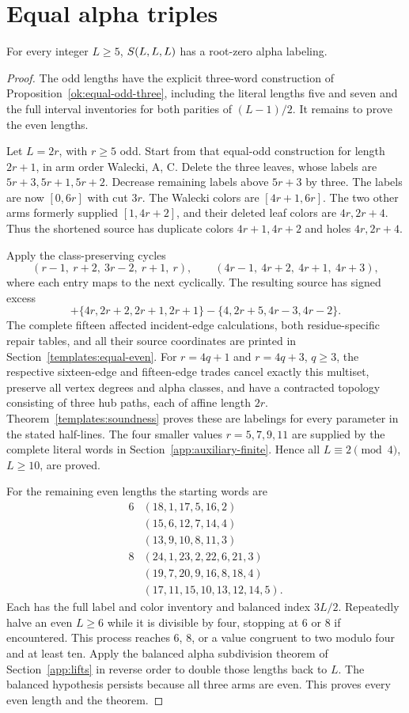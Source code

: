 \section{Equal alpha triples}\label{app:equal-alpha}
\begin{theorem}\label{ea:all}
For every integer $L\ge5$, $S\!\left(L,L,L\right)$ has a root-zero alpha labeling.
\end{theorem}
\begin{proof}
The odd lengths have the explicit three-word construction of Proposition~\ref{ok:equal-odd-three}, including the literal lengths five and seven and the full interval inventories for both parities of $(L-1)/2$. It remains to prove the even lengths.

Let $L=2r$, with $r\ge5$ odd. Start from that equal-odd construction for length $2r+1$, in arm order Walecki, A, C. Delete the three leaves, whose labels are $5r+3,5r+1,5r+2$. Decrease remaining labels above $5r+3$ by three. The labels are now $[0,6r]$ with cut $3r$. The Walecki colors are $[4r+1,6r]$. The two other arms formerly supplied $[1,4r+2]$, and their deleted leaf colors are $4r,2r+4$. Thus the shortened source has duplicate colors $4r+1,4r+2$ and holes $4r,2r+4$.

Apply the class-preserving cycles
\[
(r-1,\ r+2,\ 3r-2,\ r+1,\ r),\qquad
(4r-1,\ 4r+2,\ 4r+1,\ 4r+3),
\]
where each entry maps to the next cyclically. The resulting source has signed excess
\[
+\{4r,2r+2,2r+1,2r+1\}
-\{4,2r+5,4r-3,4r-2\}.
\]
The complete fifteen affected incident-edge calculations, both residue-specific repair tables, and all their source coordinates are printed in Section~\ref{templates:equal-even}. For $r=4q+1$ and $r=4q+3$, $q\ge3$, the respective sixteen-edge and fifteen-edge trades cancel exactly this multiset, preserve all vertex degrees and alpha classes, and have a contracted topology consisting of three hub paths, each of affine length $2r$. Theorem~\ref{templates:soundness} proves these are labelings for every parameter in the stated half-lines. The four smaller values $r=5,7,9,11$ are supplied by the complete literal words in Section~\ref{app:auxiliary-finite}. Hence all $L\equiv2\pmod4$, $L\ge10$, are proved.

For the remaining even lengths the starting words are
\[
\begin{array}{c|l}
6&(18,1,17,5,16,2)\\
 &(15,6,12,7,14,4)\\
 &(13,9,10,8,11,3)\\[2pt]
8&(24,1,23,2,22,6,21,3)\\
 &(19,7,20,9,16,8,18,4)\\
 &(17,11,15,10,13,12,14,5).
\end{array}
\]
Each has the full label and color inventory and balanced index $3L/2$. Repeatedly halve an even $L\ge6$ while it is divisible by four, stopping at $6$ or $8$ if encountered. This process reaches $6$, $8$, or a value congruent to two modulo four and at least ten. Apply the balanced alpha subdivision theorem of Section~\ref{app:lifts} in reverse order to double those lengths back to $L$. The balanced hypothesis persists because all three arms are even. This proves every even length and the theorem.
\end{proof}

